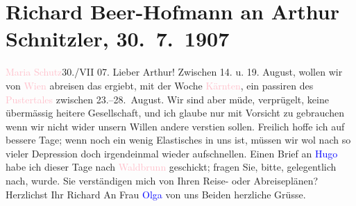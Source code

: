 

               \section[Richard Beer-Hofmann an Arthur Schnitzler, 30. 7. 1907]{ Richard Beer-Hofmann an Arthur Schnitzler, 30. 7. 1907}\nopagebreak{}\rehead{ }\normalsize\beginnumbering{} \toendnotes[C]{\smallbreak\pagebreak[2]} 
\toendnotes[C]{\smallbreak}\pstart
           \raggedleft{}{\pb}\textcolor{pink}{Maria Schutz}{}\ledrightnote{\textcolor{pink}{Maria Schutz}}{ }30./VII 07.\pend
           \pstart
           Lieber Arthur! Zwischen 14. u. 19. August,
               wollen wir von \textcolor{pink}{Wien}{}\ledrightnote{\textcolor{pink}{Wien}} abreisen das ergiebt, mit der
               Woche \textcolor{pink}{Kärnten}{}\ledrightnote{\textcolor{pink}{Kärnten}}, ein passiren des \textcolor{pink}{Pustertales}{}\ledrightnote{\textcolor{pink}{Pustertal}} zwischen 23.–28. August.\pend
           \pstart
           Wir sind aber müde, verprügelt, keine übermässig heitere Gesellschaft, und ich glaube
               nur mit Vorsicht zu gebrauchen wenn wir nicht wider unsern Willen andere versti{\geminationm}en sollen.\pend
           \pstart
           {\pb}Freilich hoffe ich auf bessere
               Tage; wenn noch ein wenig Elastisches in uns ist, müssen wir wol nach so vieler
               Depression doch irgendeinmal wieder aufschnellen.\pend
           \pstart
           Einen Brief an \textcolor{blue}{Hugo}{}\ledrightnote{\textcolor{blue}{Hugo von Hofmannsthal}} habe ich dieser Tage nach \textcolor{pink}{Waldbrunn}{}\ledrightnote{\textcolor{pink}{Wildbad Waldbrunn}} geschickt; fragen Sie, bitte, gelegentlich
               nach, \label{K_L01697_1v}\label{K_L01697_1h} wurde.\pend
           \pstart
           Sie verständigen mich von Ihren Reise- oder Abreiseplänen?\pend
           \pstart Herzlichst Ihr \spacefill\mbox{Richard}\pend{}\pstart
           An Frau \textcolor{blue}{Olga}{}\ledrightnote{\textcolor{blue}{Olga Schnitzler}} von uns Beiden herzliche Grüsse.\pend
           \endnumbering{}  
      